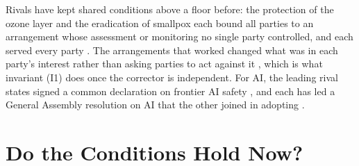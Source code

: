 \documentclass[letterpaper]{article} %
\theoremstyle{definition}
\begin{document}
Rivals have kept shared conditions above a floor before: the protection of the ozone layer and the eradication of smallpox each bound all parties to an arrangement whose assessment or monitoring no single party controlled, and each served every party \citep{barrett2003,barrett2007}. The arrangements that worked changed what was in each party's interest rather than asking parties to act against it \citep{barrett2003}, which is what invariant (I1) does once the corrector is independent. For AI, the leading rival states signed a common declaration on frontier AI safety \citep{bletchley2023}, and each has led a General Assembly resolution on AI that the other joined in adopting \citep{unga2024,unga2024capacity}.

\section{Do the Conditions Hold Now?}\label{sec:evidence}
\end{document}
